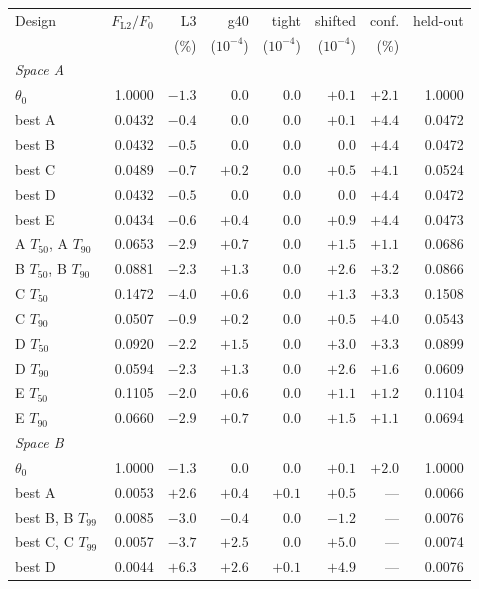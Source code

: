 \begin{tabular}{lrrrrrrr}\toprule
Design & $F_{\mathrm{L2}}/F_0$ & L3 & g40 & tight & shifted & conf. & held-out\\
 & & (\%) & ($10^{-4}$) & ($10^{-4}$) & ($10^{-4}$) & (\%) & \\\midrule
\multicolumn{8}{l}{\emph{Space A}}\\
$\theta_0$ & 1.0000 & $-1.3$ & $0.0$ & $0.0$ & $+0.1$ & $+2.1$ & 1.0000\\
best A & 0.0432 & $-0.4$ & $0.0$ & $0.0$ & $+0.1$ & $+4.4$ & 0.0472\\
best B & 0.0432 & $-0.5$ & $0.0$ & $0.0$ & $0.0$ & $+4.4$ & 0.0472\\
best C & 0.0489 & $-0.7$ & $+0.2$ & $0.0$ & $+0.5$ & $+4.1$ & 0.0524\\
best D & 0.0432 & $-0.5$ & $0.0$ & $0.0$ & $0.0$ & $+4.4$ & 0.0472\\
best E & 0.0434 & $-0.6$ & $+0.4$ & $0.0$ & $+0.9$ & $+4.4$ & 0.0473\\
A $T_{50}$, A $T_{90}$ & 0.0653 & $-2.9$ & $+0.7$ & $0.0$ & $+1.5$ & $+1.1$ & 0.0686\\
B $T_{50}$, B $T_{90}$ & 0.0881 & $-2.3$ & $+1.3$ & $0.0$ & $+2.6$ & $+3.2$ & 0.0866\\
C $T_{50}$ & 0.1472 & $-4.0$ & $+0.6$ & $0.0$ & $+1.3$ & $+3.3$ & 0.1508\\
C $T_{90}$ & 0.0507 & $-0.9$ & $+0.2$ & $0.0$ & $+0.5$ & $+4.0$ & 0.0543\\
D $T_{50}$ & 0.0920 & $-2.2$ & $+1.5$ & $0.0$ & $+3.0$ & $+3.3$ & 0.0899\\
D $T_{90}$ & 0.0594 & $-2.3$ & $+1.3$ & $0.0$ & $+2.6$ & $+1.6$ & 0.0609\\
E $T_{50}$ & 0.1105 & $-2.0$ & $+0.6$ & $0.0$ & $+1.1$ & $+1.2$ & 0.1104\\
E $T_{90}$ & 0.0660 & $-2.9$ & $+0.7$ & $0.0$ & $+1.5$ & $+1.1$ & 0.0694\\
\multicolumn{8}{l}{\emph{Space B}}\\
$\theta_0$ & 1.0000 & $-1.3$ & $0.0$ & $0.0$ & $+0.1$ & $+2.0$ & 1.0000\\
best A & 0.0053 & $+2.6$ & $+0.4$ & $+0.1$ & $+0.5$ & --- & 0.0066\\
best B, B $T_{99}$ & 0.0085 & $-3.0$ & $-0.4$ & $0.0$ & $-1.2$ & --- & 0.0076\\
best C, C $T_{99}$ & 0.0057 & $-3.7$ & $+2.5$ & $0.0$ & $+5.0$ & --- & 0.0074\\
best D & 0.0044 & $+6.3$ & $+2.6$ & $+0.1$ & $+4.9$ & --- & 0.0076\\

\end{tabular}

